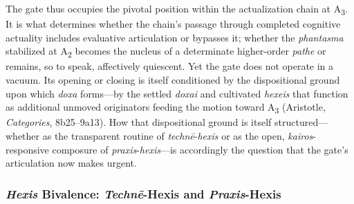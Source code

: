 \documentclass{article}
\begin{document}
The gate thus occupies the pivotal position within the actualization chain at A\textsubscript{3}. It is what determines whether the chain's passage through completed cognitive actuality includes evaluative articulation or bypasses it; whether the \textit{phantasma} stabilized at A\textsubscript{2} becomes the nucleus of a determinate higher-order \textit{pathe} or remains, so to speak, affectively quiescent. Yet the gate does not operate in a vacuum. Its opening or closing is itself conditioned by the dispositional ground upon which \textit{doxa} forms---by the settled \textit{doxai} and cultivated \textit{hexeis} that function as additional unmoved originators feeding the motion toward A\textsubscript{3} (Aristotle, \textit{Categories}, 8b25--9a13). How that dispositional ground is itself structured---whether as the transparent routine of \textit{technē}-\textit{hexis} or as the open, \textit{kairos}-responsive composure of \textit{praxis}-\textit{hexis}---is accordingly the question that the gate's articulation now makes urgent.


\subsubsection*{\textit{Hexis} Bivalence: \textit{Techn\=e}-Hexis and \textit{Praxis}-Hexis}
\end{document}
